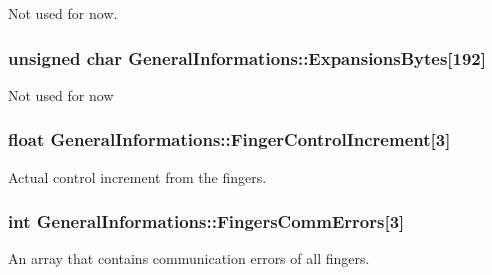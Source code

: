 Not used for now. 

\subsubsection[{\texorpdfstring{Expansions\+Bytes}{ExpansionsBytes}}]{\setlength{\rightskip}{0pt plus 5cm}unsigned char General\+Informations\+::\+Expansions\+Bytes\mbox{[}192\mbox{]}}\hypertarget{struct_general_informations_a79fda6f821bd29109818f22bfc4167b5}{}\label{struct_general_informations_a79fda6f821bd29109818f22bfc4167b5}
Not used for now 
\subsubsection[{\texorpdfstring{Finger\+Control\+Increment}{FingerControlIncrement}}]{\setlength{\rightskip}{0pt plus 5cm}float General\+Informations\+::\+Finger\+Control\+Increment\mbox{[}3\mbox{]}}\hypertarget{struct_general_informations_a538144c6ae5efec5dbeac1db517480ed}{}\label{struct_general_informations_a538144c6ae5efec5dbeac1db517480ed}


Actual control increment from the fingers. 

\subsubsection[{\texorpdfstring{Fingers\+Comm\+Errors}{FingersCommErrors}}]{\setlength{\rightskip}{0pt plus 5cm}int General\+Informations\+::\+Fingers\+Comm\+Errors\mbox{[}3\mbox{]}}\hypertarget{struct_general_informations_a2a65ca5c2039e398982814e0a2c0e862}{}\label{struct_general_informations_a2a65ca5c2039e398982814e0a2c0e862}


An array that contains communication errors of all fingers. 

